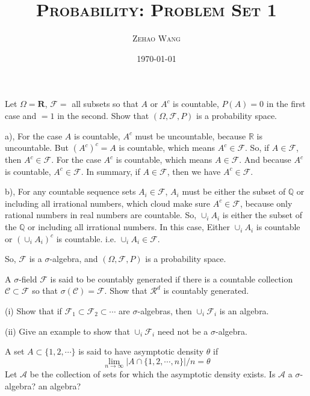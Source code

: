 \documentclass[en, normal, 11pt, black]{elegantnote}
\title{\textsc{Probability: Problem Set 1}}
\author{\textsc{Zehao Wang}}
\date{\today}
\newenvironment{exercise}[1]{\begin{tcolorbox}[colback=black!15, colframe=black!80, title=#1]}{\end{tcolorbox}}
\renewenvironment{proof}{\begin{tcolorbox}[colback=white, colframe=black!50, title=Proof. ]\setlength{\parskip}{0.8em}}{\end{tcolorbox}}
\begin{document}
\maketitle
    \begin{exercise}{1.1.1}
        Let $\Omega=\mathbf{R}$, $\mathcal{F}=$ all subsets so that $A$ or $A^c$ is countable, $P(A) = 0$ in the first case and $= 1$ in the second. Show that $(\Omega,\mathcal{F},P)$ is a probability space. 
    \end{exercise}
    \begin{proof}
        a), For the case $A$ is countable, $A^c$ must be uncountable, because $\mathbb{R}$ is uncountable. But $(A^c)^c=A$ is countable, which means $A^c\in\mathcal{F}$. So, if $A\in\mathcal{F}$, then $A^c\in\mathcal{F}$. For the case $A^c$ is countable, which means $A\in\mathcal{F}$. And because $A^c$ is countable, $A^c\in\mathcal{F}$. In summary, if $A\in\mathcal{F}$, then we have $A^c\in\mathcal{F}$. 

        b), For any countable sequence sets $A_i\in\mathcal{F}$, $A_i$ must be either the subset of $\mathbb{Q}$ or including all irrational numbers, which cloud make sure $A^c\in\mathcal{F}$, because only rational numbers in real numbers are countable. So, $\cup_iA_i$ is either the subset of the $\mathbb{Q}$ or including all irrational numbers. In this case, Either $\cup_iA_i$ is countable or $(\cup_iA_i)^c$ is countable. i.e. $\cup_iA_i\in\mathcal{F}$. 

        So, $\mathcal{F}$ is a $\sigma$-algebra, and $(\Omega,\mathcal{F},P)$ is a probability space. 
    \end{proof}
    
    \begin{exercise}{1.1.3}
        A $\sigma$-field $\mathcal{F}$ is said to be countably generated if there is a countable collection $\mathcal{C} \subset \mathcal{F}$ so that $\sigma(\mathcal{C}) = \mathcal{F}$. Show that $\mathcal{R}^d$ is countably generated. 
    \end{exercise}

    \begin{exercise}{1.1.4}
        (i) Show that if $\mathcal{F}_1\subset\mathcal{F}_2\subset\cdots$ are $\sigma$-algebras, then $\cup_i\mathcal{F}_i$ is an algebra. 
        
        (ii) Give an example to show that $\cup_i\mathcal{F}_i$ need not be a $\sigma$-algebra. 
    \end{exercise}

    \begin{exercise}{1.1.5}
        A set $A \subset \{1,2, \cdots\}$ is said to have asymptotic density $\theta$ if
        \[
        \lim _{n \rightarrow \infty}|A \cap\{1,2, \cdots, n\}| / n=\theta
        \]
        Let $\mathcal{A}$ be the collection of sets for which the asymptotic density exists. Is $\mathcal{A}$ a $\sigma$-algebra? an algebra?
    \end{exercise}
\end{document}
